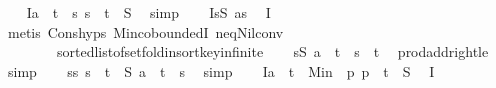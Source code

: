 \begin{isabellebody}
\ \ \isamarkupfalse%
\ I{}{\isacharcolon}{\kern0pt}{\isachardoublequoteopen}a\ {\isacharplus}{\kern0pt}\ t\ {\isasymin}\ {\isacharparenleft}{\kern0pt}{\isasymlambda}s{\isachardot}{\kern0pt}\ s\ {\isacharplus}{\kern0pt}\ t{\isacharparenright}{\kern0pt}\ {\isacharbackquote}{\kern0pt}\ S{\isachardoublequoteclose}\ \isamarkupfalse%
\ simp\isanewline
\ \ \isamarkupfalse%
\ I{}{\isacharcolon}{\kern0pt}{\isachardoublequoteopen}{\isasymforall}s{\isasymin}S{\isachardot}{\kern0pt}\ a{\isasymle}s{\isachardoublequoteclose}\ \isamarkupfalse%
\ I{}\isanewline
\ \ \ \ \isamarkupfalse%
\ {\isacharparenleft}{\kern0pt}metis\ Cons{\isachardot}{\kern0pt}hyps{\isacharparenleft}{\kern0pt}{}{\isacharparenright}{\kern0pt}\ Min{\isachardot}{\kern0pt}coboundedI\ neq{\isacharunderscore}{\kern0pt}Nil{\isacharunderscore}{\kern0pt}conv\isanewline
\ \ \ \ \ \ \ \ sorted{\isacharunderscore}{\kern0pt}list{\isacharunderscore}{\kern0pt}of{\isacharunderscore}{\kern0pt}set{\isachardot}{\kern0pt}fold{\isacharunderscore}{\kern0pt}insort{\isacharunderscore}{\kern0pt}key{\isachardot}{\kern0pt}infinite{\isacharparenright}{\kern0pt}\isanewline
\ \ \isamarkupfalse%
\ {\isachardoublequoteopen}{\isasymforall}s{\isasymin}S{\isachardot}{\kern0pt}\ a\ {\isacharplus}{\kern0pt}\ t\ {\isasymle}\ s\ {\isacharplus}{\kern0pt}\ t{\isachardoublequoteclose}\ \isamarkupfalse%
\ prod{\isacharunderscore}{\kern0pt}addright{\isacharunderscore}{\kern0pt}le\ \isamarkupfalse%
\ simp\isanewline
\ \ \isamarkupfalse%
\ {\isachardoublequoteopen}{\isasymforall}s{\isasymin}{\isacharparenleft}{\kern0pt}{\isacharparenleft}{\kern0pt}{\isasymlambda}s{\isachardot}{\kern0pt}\ s\ {\isacharplus}{\kern0pt}\ t{\isacharparenright}{\kern0pt}\ {\isacharbackquote}{\kern0pt}\ S{\isacharparenright}{\kern0pt}{\isachardot}{\kern0pt}\ a\ {\isacharplus}{\kern0pt}\ t\ {\isasymle}\ s{\isachardoublequoteclose}\ \isamarkupfalse%
\ simp\isanewline
\ \ \isamarkupfalse%
\ I{}{\isacharcolon}{\kern0pt}{\isachardoublequoteopen}a\ {\isacharplus}{\kern0pt}\ t\ {\isacharequal}{\kern0pt}\ Min\ {\isacharparenleft}{\kern0pt}{\isacharparenleft}{\kern0pt}{\isasymlambda}\ p{\isachardot}{\kern0pt}\ p\ {\isacharplus}{\kern0pt}\ t{\isacharparenright}{\kern0pt}\ {\isacharbackquote}{\kern0pt}\ S{\isacharparenright}{\kern0pt}{\isachardoublequoteclose}\ \isamarkupfalse%
\ I{}\isanewline

\end{isabellebody}
